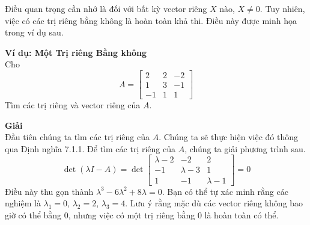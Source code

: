 Điều quan trọng cần nhớ là đối với bất kỳ vector riêng $X$ nào, $X\ne0$. Tuy nhiên, việc có các trị riêng bằng không là hoàn toàn khả thi. Điều này được minh họa trong ví dụ sau.

\textbf{Ví dụ: Một Trị riêng Bằng không} \\
Cho
\begin{equation*}
A=\begin{bmatrix}2&2&-2\\ 1&3&-1\\ -1&1&1\end{bmatrix}
\end{equation*}
Tìm các trị riêng và vector riêng của $A$.

\textbf{Giải} \\
Đầu tiên chúng ta tìm các trị riêng của $A$. Chúng ta sẽ thực hiện việc đó thông qua Định nghĩa 7.1.1.
Để tìm các trị riêng của $A$, chúng ta giải phương trình sau.
\begin{equation*}
\det(\lambda I-A)=\det\begin{bmatrix}\lambda-2&-2&2\\ -1&\lambda-3&1\\ 1&-1&\lambda-1\end{bmatrix}=0
\end{equation*}
Điều này thu gọn thành $\lambda^{3}-6\lambda^{2}+8\lambda=0$. Bạn có thể tự xác minh rằng các nghiệm là $\lambda_{1}=0$, $\lambda_{2}=2$, $\lambda_{3}=4$. Lưu ý rằng mặc dù các vector riêng không bao giờ có thể bằng 0, nhưng việc có một trị riêng bằng 0 là hoàn toàn có thể.

